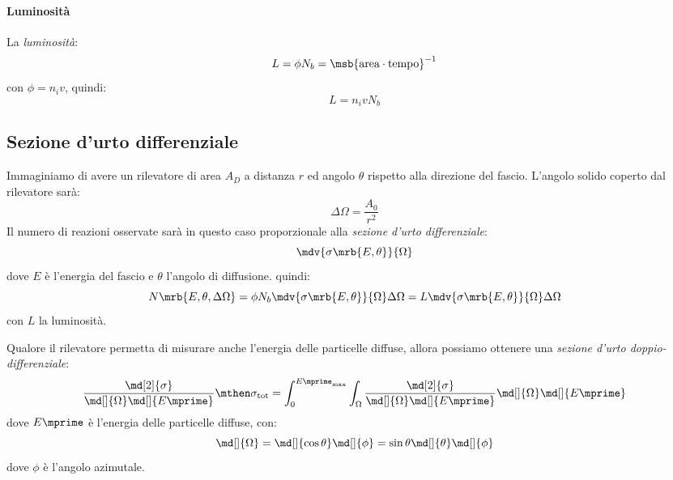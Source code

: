 \paragraph{Luminosità}
La \textit{luminosità}:
\begin{equation}
	L = \phi N_b = \msb{\text{area} \cdot \text{tempo}}^{-1}
\end{equation}
con $\phi = n_i v$, quindi:
\begin{equation}
	L = n_i v N_b
\end{equation}

\subsection{Sezione d'urto differenziale}
Immaginiamo di avere un rilevatore di area $A_D$ a distanza $r$ ed angolo
$\theta$ rispetto alla direzione del fascio.
L'angolo solido coperto dal rilevatore sarà:
\begin{equation}
	\Delta \Omega = \frac{A_0}{r^2}
\end{equation}
Il numero di reazioni osservate sarà in questo caso proporzionale alla
\textit{sezione d'urto differenziale}:
\begin{equation}
	\mdv{\sigma \mrb{E, \theta}}{\Omega}
\end{equation}
dove $E$ è l'energia del fascio e $\theta$ l'angolo di diffusione.
quindi:
\begin{equation}
	N \mrb{E, \theta, \Delta \Omega}
	= \phi N_b \mdv{\sigma \mrb{E, \theta}}{\Omega} \Delta \Omega
	= L \mdv{\sigma \mrb{E, \theta}}{\Omega} \Delta \Omega
\end{equation}
con $L$ la luminosità.

Qualore il rilevatore permetta di misurare anche l'energia delle particelle
diffuse, allora possiamo ottenere una \textit{sezione d'urto
	doppio-differenziale}:
\begin{equation}
	\frac{\md[2]{\sigma}}{\md[]{\Omega} \md[]{E \mprime}}
	\mthen
	\sigma_\text{tot}
	= \int_0^{E \mprime_{\text{max}}} \int_{\Omega}
	\frac{\md[2]{\sigma}}{\md[]{\Omega} \md[]{E \mprime}} \md[]{\Omega} \md[]{E
		\mprime}
\end{equation}
dove $E \mprime$ è l'energia delle particelle diffuse, con:
\begin{equation}
	\md[]{\Omega} = \md[]{\cos \theta} \md[]{\phi} = \sin \theta \md[]{\theta}
	\md[]{\phi}
\end{equation}
dove $\phi$ è l'angolo azimutale.

